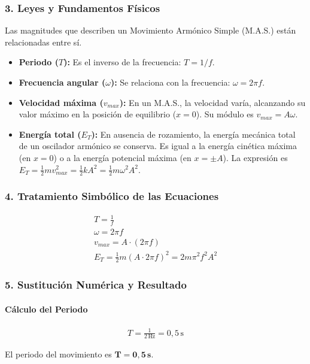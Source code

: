 \subsubsection*{3. Leyes y Fundamentos Físicos}
Las magnitudes que describen un Movimiento Armónico Simple (M.A.S.) están relacionadas entre sí.
\begin{itemize}
    \item \textbf{Periodo ($T$):} Es el inverso de la frecuencia: $T = 1/f$.
    \item \textbf{Frecuencia angular ($\omega$):} Se relaciona con la frecuencia: $\omega = 2\pi f$.
    \item \textbf{Velocidad máxima ($v_{max}$):} En un M.A.S., la velocidad varía, alcanzando su valor máximo en la posición de equilibrio ($x=0$). Su módulo es $v_{max} = A\omega$.
    \item \textbf{Energía total ($E_T$):} En ausencia de rozamiento, la energía mecánica total de un oscilador armónico se conserva. Es igual a la energía cinética máxima (en $x=0$) o a la energía potencial máxima (en $x=\pm A$). La expresión es $E_T = \frac{1}{2}m v_{max}^2 = \frac{1}{2}k A^2 = \frac{1}{2}m\omega^2A^2$.
\end{itemize}

\subsubsection*{4. Tratamiento Simbólico de las Ecuaciones}
\begin{gather}
    T = \frac{1}{f} \\
    \omega = 2\pi f \\
    v_{max} = A \cdot (2\pi f) \\
    E_T = \frac{1}{2}m(A \cdot 2\pi f)^2 = 2m\pi^2f^2A^2
\end{gather}

\subsubsection*{5. Sustitución Numérica y Resultado}
\paragraph{Cálculo del Periodo}
\begin{gather}
    T = \frac{1}{2\,\text{Hz}} = 0,5\,\text{s}
\end{gather}
\begin{cajaresultado}
    El periodo del movimiento es $\boldsymbol{T = 0,5\,\textbf{s}}$.
\end{cajaresultado}

